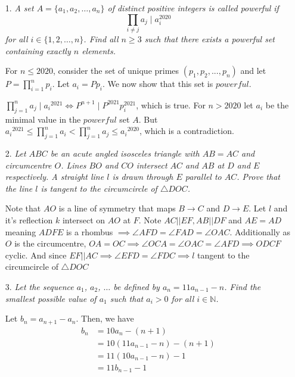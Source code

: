 \documentclass{article}
\begin{document}
\begin{enumerate}

\medskip
\item[1.] %
{\itshape A set $A = \{a_1, a_2, \dotsc, a_n\}$ of distinct positive integers is called \emph{powerful} if
\[ \prod_{i \neq j} a_j \mid a_i^{2020} \]
for all $i \in \{1, 2, \dotsc, n\}$.
Find all $n \ge 3$ such that there exists a powerful set containing exactly $n$ elements.}

For $n\leq2020$, consider the set of unique primes $(p_1,p_2,...,p_n)$ and let $P = \prod_{i=1}^{n} p_i$. Let $a_i = Pp_i$. We now show that this set is $powerful$.

$\prod_{j=1}^{n} a_j \mid {a_i}^{2021} \iff P^{n+1} \mid P^{2021}p_i^{2021}$, which is true.
For $n>2020$ let $a_i$ be the minimal value in the $powerful$ set $A$.
But ${a_i}^{2021} \leq \prod_{j=1}^{n} a_i < \prod_{j=1}^{n} a_j \leq {a_i}^{2020}$, which is a contradiction.


\medskip
\item[2.] %
{\itshape Let $ABC$ be an acute angled isosceles triangle with $AB = AC$ and circumcentre $O$.
Lines $BO$ and $CO$ intersect $AC$ and $AB$ at $D$ and $E$ respectively.
A straight line $l$ is drawn through $E$ parallel to $AC$.
Prove that the line $l$ is tangent to the circumcircle of $\triangle DOC$.}

Note that $AO$ is a line of symmetry that maps $B\rightarrow C$ and $D\rightarrow E$. Let $l$ and it's reflection $k$ intersect on $AO$ at $F$.
Note $AC||EF, AB||DF$ and $AE=AD$ meaning $ADFE$ is a rhombus $\implies \angle AFD = \angle FAD = \angle OAC$.
Additionally as $O$ is the circumcentre, $OA = OC \implies \angle OCA = \angle OAC = \angle AFD \implies ODCF$ cyclic.
And since $EF||AC\implies\angle EFD = \angle FDC\implies l$ tangent to the circumcircle of $\triangle DOC$


\medskip
\item[3.] %
{\itshape Let the sequence $a_1$, $a_2$, $\dotsc$ be defined by $a_n = 11 a_{n - 1} - n$.
Find the smallest possible value of $a_1$ such that $a_i > 0$ for all $i \in \mathbb{N}$.}

Let $b_n = a_{n + 1} - a_n$. Then, we have
\begin{align*}
	b_n &= 10a_n - (n + 1) \\
	 &= 10(11a_{n - 1} - n) - (n + 1) \\
	 &= 11(10a_{n - 1} - n) - 1 \\
	 &= 11b_{n - 1} - 1
\end{align*}


\end{enumerate}
\end{document}
